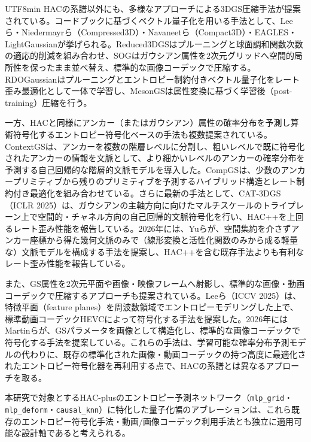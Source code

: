\documentclass{ieeeaccess}
\begin{document}
\begin{CJK}{UTF8}{min}
HACの系譜以外にも、多様なアプローチによる3DGS圧縮手法が提案されている。コードブックに基づくベクトル量子化を用いる手法として、Lee ら\cite{lee2024compact}・Niedermayrら\cite{niedermayr2024compressed}（Compressed3D）・Navaneetら\cite{navaneet2024compact3d}（Compact3D）・EAGLES\cite{girish2024eagles}・LightGaussian\cite{fan2024lightgaussian}が挙げられる。Reduced3DGS\cite{papantonakis2024reduced3dgs}はプルーニングと球面調和関数次数の適応的削減を組み合わせ、SOG\cite{morgenstern2024sog}はガウシアン属性を2次元グリッドへ空間的局所性を保ったまま並べ替え、標準的な画像コーデックで圧縮する。RDOGaussian\cite{wang2024rdogaussian}はプルーニングとエントロピー制約付きベクトル量子化をレート歪み最適化として一体で学習し、MesonGS\cite{xie2024mesongs}は属性変換に基づく学習後（post-training）圧縮を行う。

一方、HACと同様にアンカー（またはガウシアン）属性の確率分布を予測し算術符号化するエントロピー符号化ベースの手法も複数提案されている。ContextGS\cite{wang2024contextgs}は、アンカーを複数の階層レベルに分割し、粗いレベルで既に符号化されたアンカーの情報を文脈として、より細かいレベルのアンカーの確率分布を予測する自己回帰的な階層的文脈モデルを導入した。CompGS\cite{liu2024compgs}は、少数のアンカープリミティブから残りのプリミティブを予測するハイブリッド構造とレート制約付き最適化を組み合わせている。さらに最新の手法として、CAT-3DGS\cite{zhan2025cat3dgs}（ICLR 2025）は、ガウシアンの主軸方向に向けたマルチスケールのトライプレーン上で空間的・チャネル方向の自己回帰的文脈符号化を行い、HAC++を上回るレート歪み性能を報告している。2026年には、Yuら\cite{yu2026practical}が、空間集約を介さずアンカー座標から得た幾何文脈のみで（線形変換と活性化関数のみから成る軽量な）文脈モデルを構成する手法を提案し、HAC++を含む既存手法よりも有利なレート歪み性能を報告している。

また、GS属性を2次元平面や画像・映像フレームへ射影し、標準的な画像・動画コーデックで圧縮するアプローチも提案されている。Leeら\cite{lee2025codecgs}（ICCV 2025）は、特徴平面（feature planes）を周波数領域でエントロピーモデリングした上で、標準動画コーデックHEVCによって符号化する手法を提案した。2026年にはMartinら\cite{martin2026structured}が、GSパラメータを画像として構造化し、標準的な画像コーデックで符号化する手法を提案している。これらの手法は、学習可能な確率分布予測モデルの代わりに、既存の標準化された画像・動画コーデックの持つ高度に最適化されたエントロピー符号化器を再利用する点で、HACの系譜とは異なるアプローチを取る。

本研究で対象とするHAC-plusのエントロピー予測ネットワーク（\texttt{mlp\_grid}・\texttt{mlp\_deform}・\texttt{causal\_knn}）に特化した量子化幅のアブレーションは、これら既存のエントロピー符号化手法・動画/画像コーデック利用手法とも独立に適用可能な設計軸であると考えられる。


\end{CJK}
\end{document}
